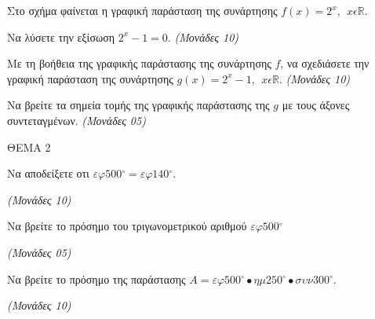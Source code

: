 \documentclass[11pt,a4paper,twoside]{book}
\newcommand{\monades}[1]{\hfill \textit{(Μονάδες #1)}}
\begin{document}
Στο σχήμα φαίνεται η γραφική παράσταση της συνάρτησης $f(x) = 2^{x},\ \ x\epsilon\mathbb{R}$.

\begin{center}
\end{center}

\begin{alist}
\item Να λύσετε την εξίσωση $2^{x} - 1 = 0$.
\monades{10}

\item Με τη βοήθεια της γραφικής παράστασης της συνάρτησης $f$, να σχεδιάσετε την γραφική παράσταση της συνάρτησης $g(x) = 2^{x} - 1,\ \ x\epsilon\mathbb{R}$.
\monades{10}

\item Να βρείτε τα σημεία τομής της γραφικής παράστασης της $g$ με τους άξονες συντεταγμένων.
\monades{05}
\end{alist}

\vspace{4mm}

ΘΕΜΑ 2

\begin{alist}
\item Να αποδείξετε οτι $\varepsilon\varphi 500{^\circ} = \varepsilon\varphi 140{^\circ}$.

\monades{10}

\item

\end{alist}
\begin{alist}
\item
  Να βρείτε το πρόσημο του τριγωνομετρικού αριθμού $\varepsilon\varphi 500{^\circ}$

\monades{05}


\end{alist}
\begin{alist}
\item
  Να βρείτε το πρόσημο της παράστασης $Α = \varepsilon\varphi 500{^\circ} \bullet \eta\mu 250{^\circ} \bullet \sigma\upsilon\nu 300{^\circ}$.

\monades{10}
\end{alist}
\end{document}
